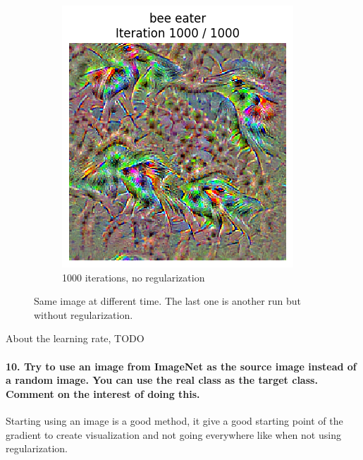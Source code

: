 \begin{figure}[H]
\begin{subfigure}[t]{.25\textwidth}
        \includegraphics[width=\linewidth]{SqueezeNet/SqueezeNet_bird_animated_1000_last_frame.png}
        \caption{1000 iterations, no regularization}
        \label{fig:class_viz_iter:sub4}
    \end{subfigure}

    \caption{Same image at different time. The last one is another run but without regularization.}
    \label{fig:class_viz_iter}
\end{figure}

About the learning rate, TODO %

\paragraph*{10. Try to use an image from ImageNet as the source image instead of a random image. You can use the real class as the target class. Comment on the interest of doing this.}

Starting using an image is a good method, it give a good starting point of the gradient to create visualization and not going everywhere like when not using regularization.

